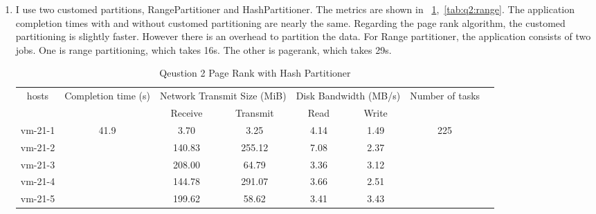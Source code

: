 \begin{enumerate}[label=Question \arabic*.]
    
    \item I use two customed partitions, RangePartitioner and HashPartitioner. The metrics are shown in \tablename{~\ref{tab:q2:hash},~\ref{tab:q2:range}}. The application completion times with and without customed partitioning are nearly the same. Regarding the page rank algorithm, the customed partitioning is slightly faster. However there is an overhead to partition the data. For Range partitioner, the application consists of two jobs. One is range partitioning, which takes 16s. The other is pagerank, which takes 29s.
    
    \begin{table}[!h]
    	\centering
    	\begin{tabular}{|c|c|c|c|c|c|c|c|}
    		\hline
    		\multirow{2}{*}{hosts} & \multirow{2}{*}{Completion time (s)} & \multicolumn{2}{|c|}{Network Transmit Size (MiB)} & \multicolumn{2}{|c|}{Disk Bandwidth (MB/s)} & \multirow{2}{*}{Number of tasks} \\ 
    		\cline{3-6}
    		& & Receive & Transmit & Read & Write &  \\
    		\hline
    		vm-21-1 & \multirow{5}{*}{41.9}  & 3.70   & 3.25   & 4.14 & 1.49 & \multirow{5}{*}{225}  \\
    		vm-21-2 &                        & 140.83 & 255.12 & 7.08 & 2.37 &  \\
    		vm-21-3 &                        & 208.00 & 64.79  & 3.36 & 3.12 &  \\
    		vm-21-4 &                        & 144.78 & 291.07 & 3.66 & 2.51 &  \\
    		vm-21-5 &                        & 199.62 & 58.62  & 3.41 & 3.43 &  \\
    		\hline
    	\end{tabular}
    	\caption{Qeustion 2 Page Rank with Hash Partitioner}
    	\label{tab:q2:hash}
    \end{table}
    

\end{enumerate}
